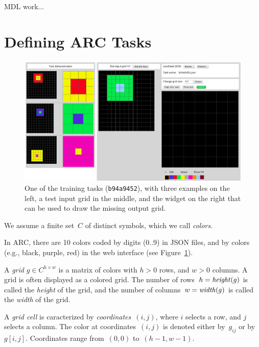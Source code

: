 \documentclass[a4paper]{llncs}
\begin{document}
MDL work...



\section{Defining ARC Tasks}
\label{arc}

\begin{figure}[t]
  \centering
  \includegraphics[width=\textwidth]{fig/training_b94a9452.png}
  \caption{One of the training tasks ({\tt b94a9452}), with three
    examples on the left, a test input grid in the middle, and the
    widget on the right that can be used to draw the missing output
    grid.}
  \label{fig:task}
\end{figure}

\begin{definition}[colors]
  We assume a finite set~$C$ of distinct symbols, which we call {\em colors}.
\end{definition}

In ARC, there are 10 colors coded by digits (0..9) in JSON files, and
by colors (e.g., black, purple, red) in the web interface (see
Figure~\ref{fig:task}).

\begin{definition}[grid]
  A {\em grid} $g \in C^{h \times w}$ is a matrix of colors with $h>0$
  rows, and $w>0$ columns. A grid is often displayed as a colored
  grid. The number of rows~$h = {\it height}(g)$ is called the {\em
    height} of the grid, and the number of
  columns~$w = {\it width}(g)$ is called the {\em width} of the grid.
  
  A {\em grid cell} is caracterized by {\em coordinates}~$(i,j)$,
  where $i$ selects a row, and $j$ selects a column. The color at
  coordinates~$(i,j)$ is denoted either by~$g_{ij}$ or by~$g[i,j]$.
  Coordinates range from~$(0,0)$ to~$(h-1,w-1)$.
\end{definition}
\end{document}
